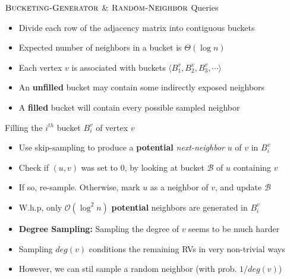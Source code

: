 \begin{block}{$\textsc{Bucketing-Generator}$ \& $\textsc{Random-Neighbor}$ Queries}

\begin{itemize}
    \item Divide each row of the adjacency matrix into contiguous buckets
    \item Expected number of neighbors in a bucket is $\Theta(\log n)$
    \item Each vertex $v$ is associated with buckets $ \langle B^v_1, B^v_2, B^v_3,\cdots\rangle$
    \item An \textbf{unfilled} bucket may contain some indirectly exposed neighbors
    \item A \textbf{filled} bucket will contain every possible sampled neighbor
\end{itemize}

\begin{alertblock}{Filling the $i^{th}$ bucket $B^v_i$ of vertex $v$}
\begin{itemize}
    \item Use skip-sampling to produce a \textbf{potential} \emph{next-neighbor} $u$ of $v$ in $B^v_i$
    \item Check if $(u, v)$ was set to $0$, by looking at bucket $\mathcal B$ of $u$ containing $v$
    \item If so, re-sample. Otherwise, mark $u$ as a neighbor of $v$, and update $\mathcal B$
    \item W.h.p, only $\mathcal O(\log^2 n)$ \textbf{potential} neighbors are generated in $B^v_i$
\end{itemize}
\end{alertblock}

\end{block}



\vspace{-0.5in}


\begin{itemize}
    \item [] \textbf{Degree Sampling:} Sampling the degree of $v$ seems to be much harder
    \item Sampling $deg(v)$ conditions the remaining RVs in very non-trivial ways
    \item However, we can stil sample a random neighbor (with prob. $1/deg(v)$)
\end{itemize}

